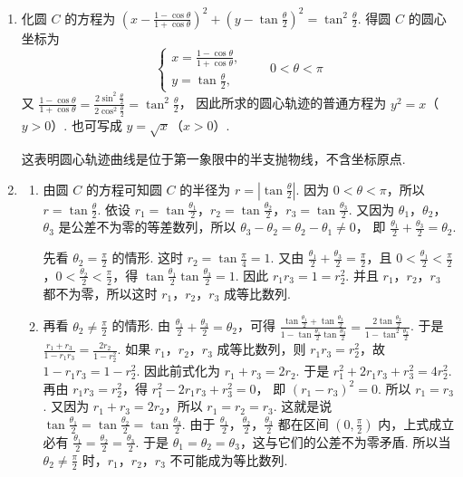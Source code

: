 \begin{solution}
\begin{enumerate}
\item 化圆 \(C\) 的方程为 \(\left( x-\frac{1-\cos \theta}{1+\cos \theta} \right)^2+\left( y-\tan \frac{\theta}{2} \right)^2=\tan^2 \frac{\theta}{2}\).
得圆 \(C\) 的圆心坐标为
\[
\begin{cases}
x=\frac{1-\cos \theta}{1+\cos \theta},\\
y=\tan \frac{\theta}{2},
\end{cases}
\qquad 0<\theta<\pi
\]
又
\(\frac{1-\cos \theta}{1+\cos \theta}=\frac{2\sin^2 \frac{\theta}{2}}{2\cos^2 \frac{\theta}{2}}=\tan^2 \frac{\theta}{2}\)，
因此所求的圆心轨迹的普通方程为
\(y^2=x\)（\(y>0\)）.
也可写成 \(y=\sqrt{x}\)（\(x>0\)）.


这表明圆心轨迹曲线是位于第一象限中的半支抛物线，不含坐标原点.

\item
\begin{enumerate}
\item 由圆 \(C\) 的方程可知圆 \(C\) 的半径为
\(r=\left| \tan \frac{\theta}{2} \right|\).
因为 \(0<\theta<\pi\)，所以 \(r=\tan \frac{\theta}{2}\). 依设
\(r_1=\tan \frac{\theta_1}{2}\)，\(r_2=\tan \frac{\theta_2}{2}\)，\(r_3=\tan \frac{\theta_3}{2}\).
又因为 \(\theta_1\)，\(\theta_2\)，\(\theta_3\) 是公差不为零的等差数列，所以
\(\theta_3-\theta_2=\theta_2-\theta_1\neq 0\)，
即
\(\frac{\theta_1}{2}+\frac{\theta_3}{2}=\theta_2\).

先看 \(\theta_2=\frac{\pi}{2}\) 的情形. 这时
\(r_2=\tan \frac{\pi}{4}=1\).
又由 \(\frac{\theta_1}{2}+\frac{\theta_3}{2}=\frac{\pi}{2}\)，且 \(0<\frac{\theta_1}{2}<\frac{\pi}{2}\)，\(0<\frac{\theta_2}{2}<\frac{\pi}{2}\)，得
\(\tan \frac{\theta_1}{2}\tan \frac{\theta_3}{2}=1\).
因此
\(r_1r_3=1=r_2^2\).
并且 \(r_1\)，\(r_2\)，\(r_3\) 都不为零，所以这时 \(r_1\)，\(r_2\)，\(r_3\) 成等比数列.

\item 再看 \(\theta_2\neq \frac{\pi}{2}\) 的情形. 由 \(\frac{\theta_1}{2}+\frac{\theta_3}{2}=\theta_2\)，可得
\(\frac{\tan \frac{\theta_1}{2}+\tan \frac{\theta_3}{2}}{1-\tan \frac{\theta_1}{2}\tan \frac{\theta_3}{2}}=\frac{2\tan \frac{\theta_2}{2}}{1-\tan^2 \frac{\theta_2}{2}}\).
于是
\(\frac{r_1+r_3}{1-r_1r_3}=\frac{2r_2}{1-r_2^2}\).
如果 \(r_1\)，\(r_2\)，\(r_3\) 成等比数列，则 \(r_1r_3=r_2^2\)，故 \(1-r_1r_3=1-r_2^2\). 因此前式化为
\(r_1+r_3=2r_2\).
于是
\(r_1^2+2r_1r_3+r_3^2=4r_2^2\).
再由 \(r_1r_3=r_2^2\)，得
\(r_1^2-2r_1r_3+r_3^2=0\)，
即
\(\left( r_1-r_3 \right)^2=0\).
所以 \(r_1=r_3\). 又因为 \(r_1+r_3=2r_2\)，所以 \(r_1=r_2=r_3\). 这就是说
\(\tan \frac{\theta_1}{2}=\tan \frac{\theta_2}{2}=\tan \frac{\theta_3}{2}\).
由于 \(\frac{\theta_1}{2}\)，\(\frac{\theta_2}{2}\)，\(\frac{\theta_3}{2}\) 都在区间 \(\left( 0,\frac{\pi}{2} \right)\) 内，上式成立必有
\(\frac{\theta_1}{2}=\frac{\theta_2}{2}=\frac{\theta_3}{2}\).
于是 \(\theta_1=\theta_2=\theta_3\)，这与它们的公差不为零矛盾. 所以当 \(\theta_2\neq \frac{\pi}{2}\) 时，\(r_1\)，\(r_2\)，\(r_3\) 不可能成为等比数列.


\end{enumerate}
\end{enumerate}
\end{solution}
